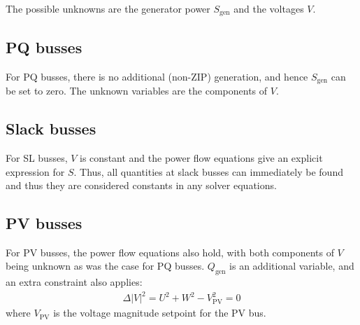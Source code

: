 \documentclass[11pt]{article}
\newcommand{\Vr}{\ensuremath{U}}
\newcommand{\Vi}{\ensuremath{W}}
\begin{document}
The possible unknowns are the generator power $S_{\text{gen}}$ and the voltages $V$.

\subsection{PQ busses}
For PQ busses, there is no additional (non-ZIP) generation, and hence $S_{\text{gen}}$ can be set to zero. The unknown variables are the components of $V$.
\subsection{Slack busses}
For SL busses, $V$ is constant and the power flow equations give an explicit expression for $S$. Thus, all quantities at slack busses can immediately be found and thus they are considered constants in any solver equations.
\subsection{PV busses}
For PV busses, the power flow equations also hold, with both components of $V$ being unknown as was the case for PQ busses. $Q_{\text{gen}}$ is an additional variable, and an extra constraint also applies:
\begin{align}
\Delta |V|^2 = \Vr^2 + \Vi^2 - V_\text{PV}^2 = 0
\label{EQ_POWERFLOW_PV_CONSTRAINT}
\end{align}
where $V_{\text{PV}}$ is the voltage magnitude setpoint for the PV bus.
\end{document}
